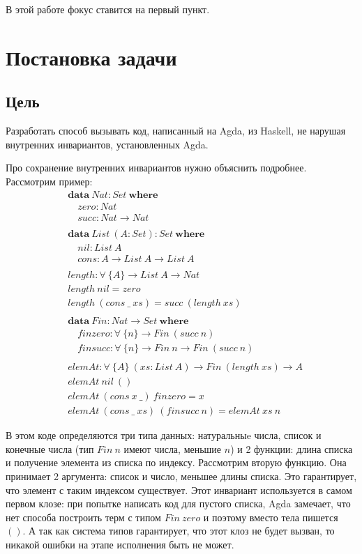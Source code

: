 В этой работе фокус ставится на первый пункт.

\newpage
\section{Постановка задачи}

\subsection{Цель}\label{sec:task-goal}

Разработать способ вызывать код, написанный на Agda, из Haskell, не нарушая
внутренних инвариантов, установленных Agda.

Про сохранение внутренних инвариантов нужно объяснить подробнее. Рассмотрим пример:
\begin{align*}
&\mathbf{data}\ Nat : Set\ \mathbf{where}\\
&\quad zero : Nat\\
&\quad succ : Nat \rightarrow Nat\\
\\
&\mathbf{data}\ List\ (A : Set) : Set\ \mathbf{where}\\
&\quad nil : List\ A\\
&\quad cons : A \rightarrow List\ A \rightarrow List\ A\\
\\
&length : \forall\ \{A\} \rightarrow List\ A \rightarrow Nat\\
&length\ nil = zero\\
&length\ (cons\ \_\ xs) = succ\ (length\ xs)\\
\\
&\mathbf{data}\ Fin : Nat \rightarrow Set\ \mathbf{where}\\
&\quad finzero : \forall\ \{n\} \rightarrow Fin\ (succ\ n)\\
&\quad finsucc : \forall\ \{n\} \rightarrow Fin\ n \rightarrow Fin\ (succ\ n)\\
\\
&elemAt : \forall\ \{A\}\ (xs : List\ A) \rightarrow Fin\ (length\ xs) \rightarrow A\\
&elemAt\ nil\ ()\\
&elemAt\ (cons\ x\ \_)\ finzero = x\\
&elemAt\ (cons\ \_\ xs)\ (finsucc\ n) = elemAt\ xs\ n
\end{align*}

В этом коде определяются три типа данных: натуральныe числа,
список и конечные числа (тип \(Fin\ n\) имеют числа, меньшие \(n\)) и
2 функции: длина списка и получение элемента из списка по индексу.
Рассмотрим вторую функцию. Она принимает 2 аргумента: список и число,
меньшее длины списка. Это гарантирует, что элемент с таким индексом
существует. Этот инвариант используется в самом первом клозе:
при попытке написать код для пустого списка, Agda замечает, что нет способа
построить терм с типом \(Fin\ zero\) и поэтому вместо тела пишется \(()\).
А так как система типов гарантирует, что этот клоз не будет вызван, то
никакой ошибки на этапе исполнения быть не может.

